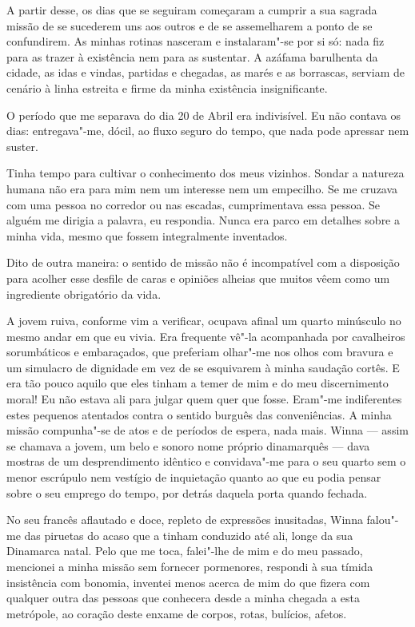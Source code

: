 A partir desse, os dias que se seguiram começaram a cumprir a sua
sagrada missão de se sucederem uns aos outros e de se assemelharem a
ponto de se confundirem. As minhas rotinas nasceram e instalaram"-se
por si só: nada fiz para as trazer à existência nem para as sustentar. A
azáfama barulhenta da cidade, as idas e vindas, partidas e chegadas, as
marés e as borrascas, serviam de cenário à linha estreita e firme da
minha existência insignificante.

O período que me separava do dia 20 de Abril era indivisível. Eu não
contava os dias: entregava"-me, dócil, ao fluxo seguro do tempo, que nada
pode apressar nem suster.

Tinha tempo para cultivar o conhecimento dos meus vizinhos. Sondar a
natureza humana não era para mim nem um
interesse nem um empecilho. Se me cruzava com uma pessoa no corredor ou
nas escadas, cumprimentava essa pessoa. Se alguém me dirigia a
palavra, eu respondia. Nunca era parco em detalhes sobre a minha vida,
mesmo que fossem integralmente inventados.

Dito de outra maneira: o sentido de missão não é incompatível com a
disposição para acolher esse desfile de caras e opiniões alheias que
muitos vêem como um ingrediente obrigatório da vida.

A jovem ruiva, conforme vim a verificar, ocupava afinal um quarto
minúsculo no mesmo andar em que eu vivia. Era frequente vê"-la
acompanhada por cavalheiros sorumbáticos e embaraçados, que preferiam
olhar"-me nos olhos com bravura e um simulacro de dignidade em vez de se
esquivarem à minha saudação cortês. E era tão pouco aquilo que eles
tinham a temer de mim e do meu discernimento moral! Eu não estava ali
para julgar quem quer que fosse. Eram"-me indiferentes estes pequenos
atentados contra o sentido burguês das conveniências. A minha missão
compunha"-se de atos e de períodos de espera, nada mais. Winna ---
assim se chamava a jovem, um belo e sonoro nome próprio dinamarquês ---
dava mostras de um desprendimento idêntico e convidava"-me para o seu
quarto sem o menor escrúpulo nem vestígio de inquietação quanto ao que
eu podia pensar sobre o seu emprego do tempo, por detrás daquela porta
quando fechada.

No seu francês aflautado e doce, repleto de expressões inusitadas,
Winna falou"-me das piruetas do acaso que a tinham conduzido até ali,
longe da sua Dinamarca natal. Pelo que me toca, falei"-lhe de mim e do
meu passado, mencionei a minha missão sem fornecer pormenores, respondi
à sua tímida insistência com bonomia, inventei menos acerca de mim do
que
fizera com qualquer outra das pessoas que conhecera desde a minha
chegada a esta metrópole, ao coração deste enxame de corpos, rotas,
bulícios, afetos.

